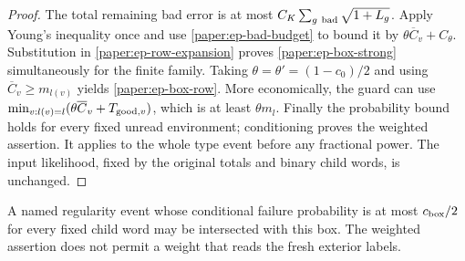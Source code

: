 \begin{proof}
The total remaining bad error is at most
$C_K\sum_{g\ {\rm bad}}\sqrt{1+L_g}$.
Apply Young's inequality once and use
\eqref{paper:ep-bad-budget} to bound it by
$\theta\overline C_v+C_\theta$.  Substitution in
\eqref{paper:ep-row-expansion} proves
\eqref{paper:ep-box-strong} simultaneously for the finite family.
Taking $\theta=\theta'=(1-c_0)/2$ and using
$\overline C_v\geq m_{l(v)}$ yields
\eqref{paper:ep-box-row}.  More economically, the guard can use
$\min_{v:l(v)=l}(\theta\overline C_v+T_{{\rm good},v})$,
which is at least $\theta m_l$.
Finally the probability bound holds for every fixed unread environment;
conditioning proves the weighted assertion.  It applies to the whole
type event before any fractional power.  The input likelihood, fixed
by the original totals and binary child words, is unchanged.
\end{proof}
A named regularity event whose conditional failure probability is at
most $c_{\rm box}/2$ for every fixed child word may be intersected
with this box.  The weighted assertion does not permit a weight that
reads the fresh exterior labels.

